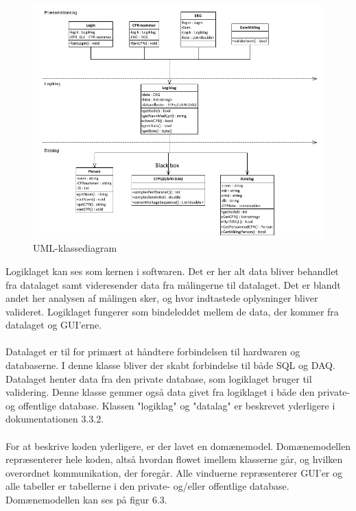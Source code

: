 \begin{figure}[H]
	\centering
	\includegraphics[width=1\textwidth]{Figurer/Snip20150512_9}
	\caption{UML-klassediagram}
\end{figure}
 
Logiklaget kan ses som kernen i softwaren. Det er her alt data bliver behandlet fra datalaget samt videresender data fra målingerne til datalaget. Det er blandt andet her analysen af målingen sker, og hvor indtastede oplysninger bliver valideret. Logiklaget fungerer som bindeleddet mellem de data, der kommer fra datalaget og GUI’erne. \\ \\
Datalaget er til for primært at håndtere forbindelsen til hardwaren og databaserne. I denne klasse bliver der skabt forbindelse til både SQL og DAQ. Datalaget henter data fra den private database, som logiklaget bruger til validering. Denne klasse gemmer også data givet fra logiklaget i både den private- og offentlige database. Klassen "logiklag" og "datalag" er beskrevet yderligere i dokumentationen 3.3.2. \\ \\
For at beskrive koden yderligere, er der lavet en domænemodel. Domænemodellen repræsenterer hele koden, altså hvordan flowet imellem klasserne går, og hvilken overordnet kommunikation, der foregår. Alle vinduerne repræsenterer GUI’er og alle tabeller er tabellerne i den private- og/eller offentlige database. Domænemodellen kan ses på figur 6.3. 

